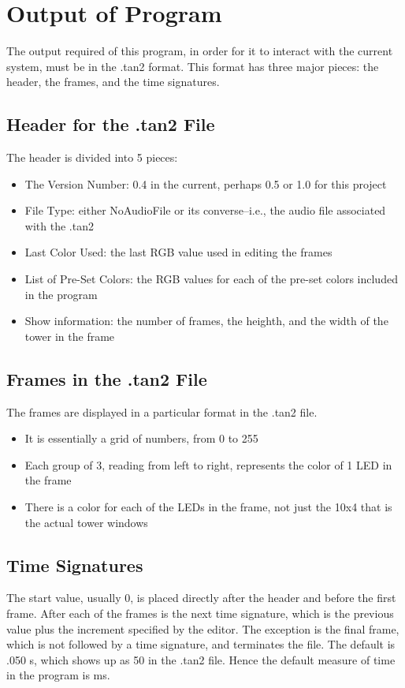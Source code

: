 
\section{Output of Program}
The output required of this program, in order for it to interact with the current system, must be in the .tan2 format.  This format has three major pieces: the header, the frames, and the time signatures.
\newline
\subsection{Header for the .tan2 File}
The header is divided into 5 pieces:
	\begin{itemize}
		\item The Version Number: 0.4 in the current, perhaps 0.5 or 1.0 for this project
		\item File Type: either NoAudioFile or its converse--i.e., the audio file associated with the .tan2
		\item Last Color Used: the last RGB value used in editing the frames
		\item List of Pre-Set Colors: the RGB values for each of the pre-set colors included in the program
		\item Show information: the number of frames, the heighth, and the width of the tower in the frame
	\end{itemize}
\subsection{Frames in the .tan2 File}
The frames are displayed in a particular format in the .tan2 file.
	\begin{itemize}
		\item It is essentially a grid of numbers, from 0 to 255
		\item Each group of 3, reading from left to right, represents the color of 1 LED in the frame
		\item There is a color for each of the LEDs in the frame, not just the 10x4 that is the actual tower windows
	\end{itemize}

\subsection{Time Signatures}
The start value, usually 0, is placed directly after the header and before the first frame.  After each of the frames is the next time signature, which is the previous value plus the increment specified by the editor.  The exception is the final frame, which is not followed by a time signature, and terminates the file.  The default is .050 s, which shows up as 50 in the .tan2 file.  Hence the default measure of time in the program is ms.

